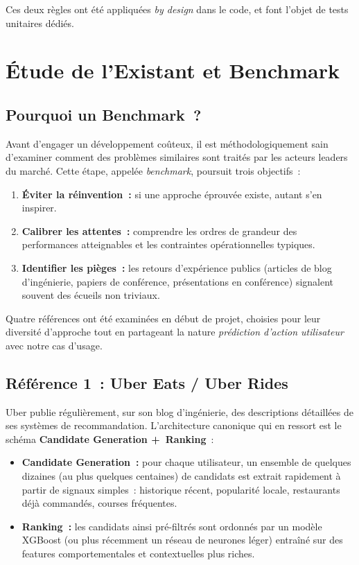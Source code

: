 \documentclass[11pt, a4paper]{article}
\begin{document}
Ces deux règles ont été appliquées \textit{by design} dans le code, et
font l'objet de tests unitaires dédiés.

\newpage
\section{Étude de l'Existant et Benchmark}

\subsection{Pourquoi un Benchmark~?}

Avant d'engager un développement coûteux, il est méthodologiquement sain
d'examiner comment des problèmes similaires sont traités par les
acteurs leaders du marché. Cette étape, appelée \textit{benchmark},
poursuit trois objectifs~:
\begin{enumerate}
\item \textbf{Éviter la réinvention~:} si une approche éprouvée existe,
    autant s'en inspirer.
\item \textbf{Calibrer les attentes~:} comprendre les ordres de grandeur
    des performances atteignables et les contraintes opérationnelles
    typiques.
\item \textbf{Identifier les pièges~:} les retours d'expérience publics
    (articles de blog d'ingénierie, papiers de conférence, présentations
    en conférence) signalent souvent des écueils non triviaux.
\end{enumerate}

Quatre références ont été examinées en début de projet, choisies pour
leur diversité d'approche tout en partageant la nature
\textit{prédiction d'action utilisateur} avec notre cas d'usage.

\subsection{Référence 1~: Uber Eats / Uber Rides}

Uber publie régulièrement, sur son blog d'ingénierie, des descriptions
détaillées de ses systèmes de recommandation. L'architecture canonique
qui en ressort est le schéma \textbf{Candidate Generation +~Ranking}~:
\begin{itemize}
\item \textbf{Candidate Generation~:} pour chaque utilisateur, un
    ensemble de quelques dizaines (au plus quelques centaines) de
    candidats est extrait rapidement à partir de signaux simples~:
    historique récent, popularité locale, restaurants déjà commandés,
    courses fréquentes.
\item \textbf{Ranking~:} les candidats ainsi pré-filtrés sont ordonnés
    par un modèle XGBoost (ou plus récemment un réseau de neurones
    léger) entraîné sur des features comportementales et contextuelles
    plus riches.
\end{itemize}
\end{document}
